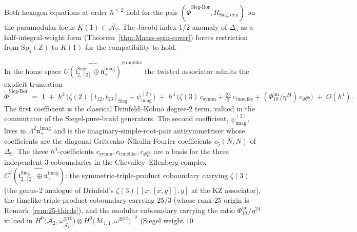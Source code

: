 \begin{theorem}
\label{thm:hexagon-R-Sieg}
Both hexagon equations at order $\hbar^{\leq 2}$ hold for the pair
$(\widetilde{\Phi}^{\mathrm{Sieg\text{-}Bor}}, R_{\mathrm{Sieg,dyn}})$ on the paramodular
locus $K(1)\subset \overline{\mathcal{A}_2}$. The Jacobi index-$1/2$ anomaly of
$\Delta_5$ as a half-integral-weight form (Theorem~\ref{thm:Maass-spin-cover}) forces
restriction from $\mathrm{Sp}_4(\mathbb{Z})$ to $K(1)$ for the compatibility to hold.
\end{theorem}

\begin{remark}
\label{rem:siegel-borcherds-explicit-expansion}
In the home space
$\widehat{U(\mathfrak{t}^{\mathrm{Sieg}}_{2,[2]}\oplus\mathfrak{n}_+^{\mathrm{imag}})}^{\mathrm{grouplike}}$
the twisted associator admits the explicit truncation
\[
 \widetilde{\Phi}^{\mathrm{Sieg\text{-}Bor}}
 \;=\;
 1
 \;+\;
 \hbar^2\,\bigl(\zeta(2)\,[t_{12},t_{23}]_{\mathrm{Sieg}}
 + \psi^{(2)}_{\mathrm{imag}}\bigr)
 \;+\;
 \hbar^3\,\bigl(\zeta(3)\,c_{\mathrm{symm}}
 + \tfrac{25}{3}\,c_{\mathrm{timelike}}
 + (\Phi_{10}^{\mathrm{un}}/\eta^{24})\,c_{\Phi_{10}^{\mathrm{un}}}\bigr)
 \;+\;
 O(\hbar^4).
\]
The first coefficient is the classical Drinfeld--Kohno degree-$2$ term, valued in the
commutator of the Siegel-pure-braid generators. The second coefficient, $\psi^{(2)}_{\mathrm{imag}}$,
lives in $\Lambda^2\mathfrak{n}_+^{\mathrm{imag}}$ and is the imaginary-simple-root-pair
antisymmetriser whose coefficients are the diagonal Gritsenko--Nikulin Fourier
coefficients $c_5(N,N)$ of $\Delta_5$. The three $\hbar^3$-coefficients
$c_{\mathrm{symm}}, c_{\mathrm{timelike}}, c_{\Phi_{10}^{\mathrm{un}}}$ are a basis for the three
independent $3$-coboundaries in the Chevalley--Eilenberg complex
$C^3(\widehat{\mathfrak{t}^{\mathrm{Sieg}}_{2,[2]}\oplus\mathfrak{n}_+^{\mathrm{imag}}})$:
the symmetric-triple-product coboundary carrying $\zeta(3)$ (the genus-$2$ analogue of
Drinfeld's $\zeta(3)[[x,[x,y]],y]$ at the KZ associator), the timelike-triple-product
coboundary carrying $25/3$ (whose rank-$25$ origin is Remark~\ref{rem:25-thirds}), and
the modular coboundary carrying the ratio $\Phi_{10}^{\mathrm{un}}/\eta^{24}$ valued in
$H^0\bigl(\overline{\mathcal{A}_2}, \omega_{\overline{\mathcal{A}_2}}^{\otimes 10}\bigr)
\otimes H^0\bigl(\mathcal{M}_{1,1}, \omega^{\otimes 12}\bigr)^{-2}$ (Siegel weight $10$

\end{remark}

